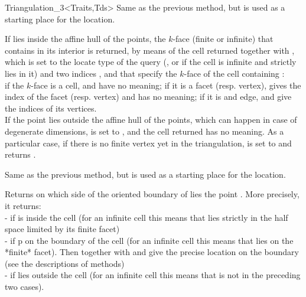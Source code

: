 \begin{ccClassTemplate}{Triangulation_3<Traits,Tds>}
{Same as the previous method, but  is used as a starting
place for the location.}

{If  lies inside the affine hull of the points, the $k$-face
(finite or infinite) that contains  in its interior is
returned, by means of the cell returned together with , which
is set to the locate type of the query (, or  if the cell is infinite and 
strictly lies in it) and two indices , and  that
specify the $k$-face of the cell containing :\\ 
if the $k$-face is a cell,  and  have no
meaning; if it is a facet (resp. vertex),  gives the index of
the facet (resp. vertex) and  has no meaning; if it is and
edge,  and  give the indices of its vertices.\\ 
If the point  lies outside the affine hull of the points,
which can happen in case of degenerate dimensions,  is set to
, and the cell returned has no meaning.
As a particular case, if there is no finite vertex yet in the
triangulation,  is set to  and
 returns . 
}

{Same as the previous method, but  is used as a starting
place for the location.}

{Returns on which side of the oriented boundary of  lies 
the point . More precisely, it returns:\\
-  if  is inside the cell (for an infinite
cell this means that  lies strictly in the half space limited by
its finite facet) \\
-  if p on the boundary of the cell (for an infinite
cell this means that  lies on the *finite* facet). Then
 together with  and  give the precise location
on the boundary (see the descriptions of  methods)\\ 
-  if  lies outside the cell (for an
infinite cell this means that  is not in the preceding two
cases).
}


\end{ccClassTemplate}

